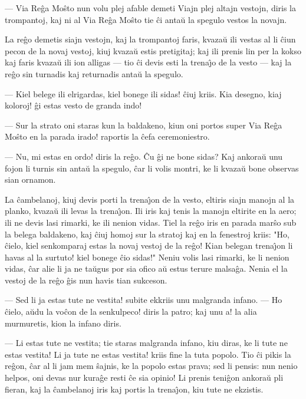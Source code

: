  --- Via Re\^ga Mo\^sto nun volu plej afable demeti Viajn plej altajn
vestojn, diris la trompantoj, kaj ni al Via Re\^ga Mo\^sto tie \^ci
anta\u u la spegulo vestos la novajn.

   La re\^go demetis siajn vestojn, kaj la trompantoj faris, kvaza\u u
ili vestas al li \^ciun pecon de la novaj vestoj, kiuj kvaza\u u
estis pretigitaj; kaj ili prenis lin per la kokso kaj faris kvaza\u
u ili ion alligas --- tio \^ci devis esti la trena\^{\j}o de la
vesto --- kaj la re\^go sin turnadis kaj returnadis anta\u u la
spegulo.

 --- Kiel belege ili elrigardas, kiel bonege ili sidas! \^ciuj kriis.
Kia desegno, kiaj koloroj! \^gi estas vesto de granda indo!

 --- Sur la strato oni staras kun la baldakeno, kiun oni portos super
Via Re\^ga Mo\^sto en la parada irado! raportis la \^cefa
ceremoniestro.

 --- Nu, mi estas en ordo! diris la re\^go. \^Cu \^gi ne bone sidas?
Kaj ankora\u u unu fojon li turnis sin anta\u u la spegulo, \^car li
volis montri, ke li kvaza\u u bone observas sian ornamon.

   La \^cambelanoj, kiuj devis porti la trena\^{\j}on de la vesto, eltiris
siajn manojn al la planko, kvaza\u u ili levas la trena\^{\j}on. Ili
iris kaj tenis la manojn eltirite en la aero; ili ne devis lasi
rimarki, ke ili nenion vidas. Tiel la re\^go iris en parada mar\^so
sub la belega baldakeno, kaj \^ciuj homoj sur la stratoj kaj en la
fenestroj kriis: "Ho, \^cielo, kiel senkomparaj estas la novaj
vestoj de la re\^go! Kian belegan trena\^{\j}on li havas al la
surtuto! kiel bonege \^cio sidas!" Neniu volis lasi rimarki, ke li
nenion vidas, \^car alie li ja ne ta\u ugus por sia ofico a\u u
estus terure malsa\^ga. Nenia el la vestoj de la re\^go \^gis nun
havis tian sukceson.

 --- Sed li ja estas tute ne vestita! subite ekkriis unu malgranda
infano. --- Ho \^cielo, a\u udu la vo\^con de la senkulpeco! diris
la patro; kaj unu a! la alia murmuretis, kion la infano diris.

 --- Li estas tute ne vestita; tie staras malgranda infano, kiu diras,
ke li tute ne estas vestita! Li ja tute ne estas vestita! kriis fine
la tuta popolo. Tio \^ci pikis la re\^gon, \^car al li jam mem
\^sajnis, ke la popolo estas prava; sed li pensis: nun nenio helpos,
oni devas nur kura\^ge resti \^ce sia opinio! Li prenis teni\^gon
ankora\u u pli fieran, kaj la \^cambelanoj iris kaj portis la
trena\^{\j}on, kiu tute ne ekzistis.

\smallrule{}
